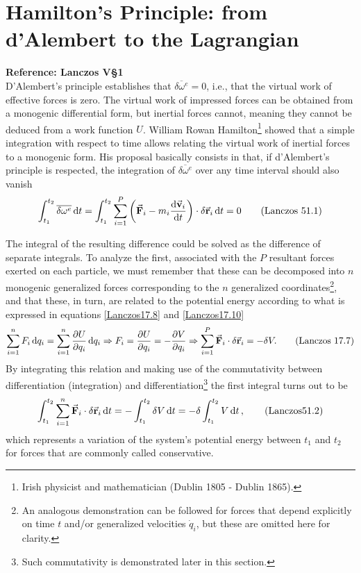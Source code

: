 \documentclass[12pt, english, a4paper]{article}
\begin{document}
\section{Hamilton's Principle: from d'Alembert to the Lagrangian}\label{principioHamilton}
\textbf{Reference: Lanczos V\S1}\\
 

D'Alembert's principle establishes that \(\overline{\delta \omega^e}= 0\), i.e., that the virtual work of effective forces is zero.
The virtual work of impressed forces can be obtained from a monogenic differential form, but inertial forces cannot, meaning they cannot be deduced from a work function \(U\).
William Rowan Hamilton\footnote{Irish physicist and mathematician (Dublin 1805 - Dublin 1865).} showed that a simple integration with respect to time allows relating the virtual work of inertial forces to a monogenic form.
His proposal basically consists in that, if d'Alembert's principle is respected, the integration of \(\overline{\delta \omega^e}\) over any time interval should also vanish
\begin{equation}\label{Lanczos51.1}
	\int^{t_2}_{t_1} \overline{\delta \omega^e} \dd{t}= \int^{t_2}_{t_1} \sum_{i=1}^P \pqty{ \va{F}_i - m_i \dv{\va{v}_i}{t} } \cdot \delta \va{r}_i \dd{t}= 0 
	\tag{Lanczos 51.1}
\end{equation}

The integral of the resulting difference could be solved as the difference of separate integrals.
To analyze the first, associated with the \(P\) resultant forces exerted on each particle, we must remember that these can be decomposed into \(n\) monogenic generalized forces corresponding to the \(n\) generalized coordinates\footnote{
    An analogous demonstration can be followed for forces that depend explicitly on time \(t\) and/or generalized velocities \(\dot{q}_i\), but these are omitted here for clarity.
}, and that these, in turn, are related to the potential energy according to what is expressed in equations \eqref{Lanczos17.8} and \eqref{Lanczos17.10} 
\begin{equation}\label{Lanczos17.7}
	\sum_{i=1}^n F_i \dd{q_i}= \sum_{i=1}^n \pdv{U}{q_i} \dd{q_i} \Rightarrow F_i= \pdv{U}{q_i}= - \pdv{V}{q_i} \Rightarrow \sum_{i=1}^P \va{F}_i \cdot \delta \va{r}_i = - \delta V.
	\tag{Lanczos 17.7}
\end{equation}
By integrating this relation and making use of the commutativity between differentiation (integration) and differentiation\footnote{Such commutativity is demonstrated later in this section.} the first integral turns out to be
\begin{equation}\label{Lanczos51.2}
	\int^{t_2}_{t_1} \sum_{i=1}^n \va{F}_i \cdot \delta \va{r}_i \dd{t} = - \int^{t_2}_{t_1} \delta V \dd{t}=
- \delta \int^{t_2}_{t_1} V \dd{t} ,
	\tag{Lanczos51.2}
\end{equation} 
which represents a variation of the system's potential energy between \(t_1\) and \(t_2\) for forces that are commonly called conservative.
\end{document}
